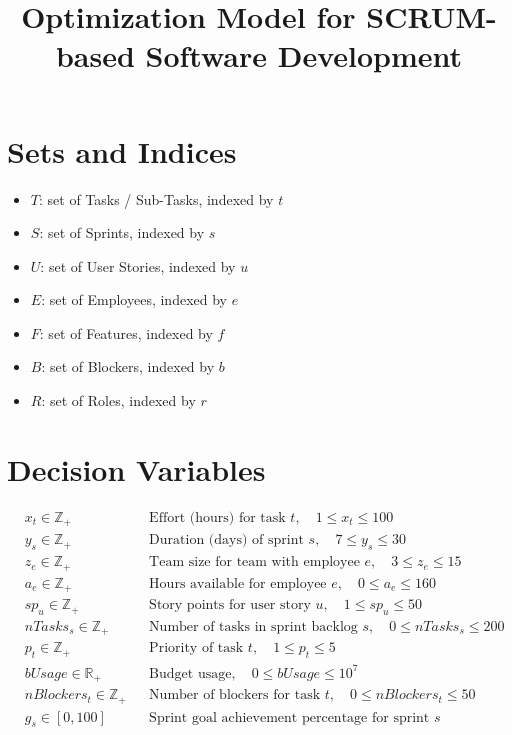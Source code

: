 \documentclass{article}
\begin{document}
\title{Optimization Model for SCRUM-based Software Development}
\author{}
\date{}
\maketitle

\section*{Sets and Indices}

\begin{itemize}
    \item $T$: set of Tasks / Sub-Tasks, indexed by $t$
    \item $S$: set of Sprints, indexed by $s$
    \item $U$: set of User Stories, indexed by $u$
    \item $E$: set of Employees, indexed by $e$
    \item $F$: set of Features, indexed by $f$
    \item $B$: set of Blockers, indexed by $b$
    \item $R$: set of Roles, indexed by $r$
\end{itemize}

\section*{Decision Variables}

\begin{align*}
    & x_t \in \mathbb{Z}_+ && \text{Effort (hours) for task } t, \quad 1 \leq x_t \leq 100 \\
    & y_s \in \mathbb{Z}_+ && \text{Duration (days) of sprint } s, \quad 7 \leq y_s \leq 30 \\
    & z_e \in \mathbb{Z}_+ && \text{Team size for team with employee } e, \quad 3 \leq z_e \leq 15 \\
    & a_e \in \mathbb{Z}_+ && \text{Hours available for employee } e, \quad 0 \leq a_e \leq 160 \\
    & sp_u \in \mathbb{Z}_+ && \text{Story points for user story } u, \quad 1 \leq sp_u \leq 50 \\
    & nTasks_s \in \mathbb{Z}_+ && \text{Number of tasks in sprint backlog } s, \quad 0 \leq nTasks_s \leq 200 \\
    & p_t \in \mathbb{Z}_+ && \text{Priority of task } t, \quad 1 \leq p_t \leq 5 \\
    & bUsage \in \mathbb{R}_+ && \text{Budget usage}, \quad 0 \leq bUsage \leq 10^7 \\
    & nBlockers_t \in \mathbb{Z}_+ && \text{Number of blockers for task } t, \quad 0 \leq nBlockers_t \leq 50 \\
    & g_s \in [0, 100] && \text{Sprint goal achievement percentage for sprint } s
\end{align*}
\end{document}
